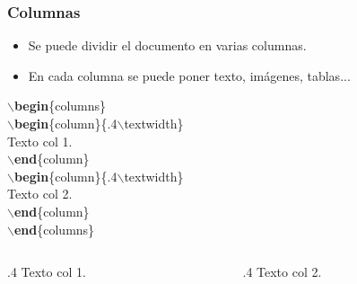 \documentclass[aspectratio=1610]{beamer}%
\begin{document}
\begin{frame}[fragile]
\frametitle{\textbf{Columnas}}
\justifying
 \begin{itemize}\justifying
  \item Se puede dividir el documento en varias columnas.
  \item En cada columna se puede poner texto, imágenes, tablas...
\end{itemize}

\begin{minipage}[l]{0.4\linewidth}


$\backslash$\textbf{begin}\{columns\} \\
$\backslash$\textbf{begin}\{column\}\{.4$\backslash$textwidth\} \\
Texto col 1.\\
$\backslash$\textbf{end}\{column\} \\
$\backslash$\textbf{begin}\{column\}\{.4$\backslash$textwidth\} \\
Texto col 2.\\
$\backslash$\textbf{end}\{column\}\\
$\backslash$\textbf{end}\{columns\}

\end{minipage}\hfill
\begin{minipage}[r]{0.58\linewidth}
\begin{columns} 
\begin{column}{.4\textwidth} 
Texto col 1.
\end{column} 
\begin{column}{.4\textwidth} 
Texto col 2.
\end{column}
\end{columns}
\end{minipage}

\end{frame}
\end{document}
